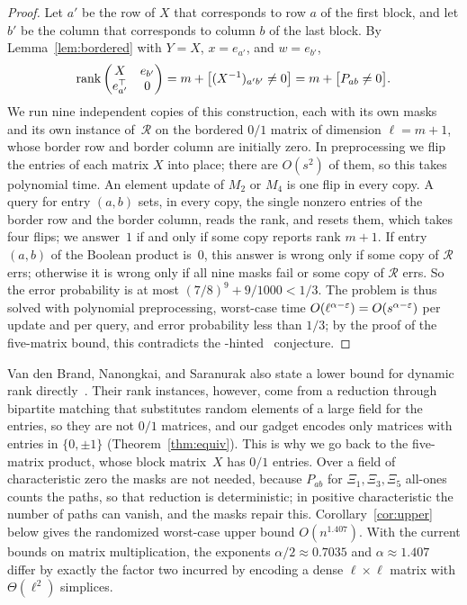 \begin{proof}
Let $a'$ be the row of $X$ that corresponds to row $a$ of the first block, and let $b'$ be the column that corresponds to column $b$ of the last block.
By Lemma~\ref{lem:bordered} with $Y=X$, $x=e_{a'}$, and $w=e_{b'}$,
\[
  \operatorname{rank}\begin{pmatrix}X&e_{b'}\\e_{a'}^{\top}&0\end{pmatrix}=m+\bigl[(X^{-1})_{a'b'}\neq0\bigr]=m+\bigl[P_{ab}\ne0\bigr].
\]
We run nine independent copies of this construction, each with its own masks and its own instance of~$\mathcal{R}$ on the bordered $0/1$ matrix of dimension $\ell=m+1$, whose border row and border column are initially zero.
In preprocessing we flip the entries of each matrix $X$ into place; there are $O(s^2)$ of them, so this takes polynomial time.
An element update of $M_2$ or $M_4$ is one flip in every copy.
A query for entry $(a,b)$ sets, in every copy, the single nonzero entries of the border row and the border column, reads the rank, and resets them, which takes four flips; we answer~$1$ if and only if some copy reports rank $m+1$.
If entry $(a,b)$ of the Boolean product is~$0$, this answer is wrong only if some copy of $\mathcal{R}$ errs; otherwise it is wrong only if all nine masks fail or some copy of $\mathcal{R}$ errs.
So the error probability is at most $(7/8)^9+9/1000<1/3$.
The problem is thus solved with polynomial preprocessing, worst-case time $O(\ell^{\alpha-\varepsilon})=O(s^{\alpha-\varepsilon})$ per update and per query, and error probability less than $1/3$; by the proof of the five-matrix bound, this contradicts the \uMv-hinted \uMv\ conjecture.
\end{proof}

Van den Brand, Nanongkai, and Saranurak also state a lower bound for dynamic rank directly~\cite[Corollary~5.15]{vdBNS19full}.
Their rank instances, however, come from a reduction through bipartite matching that substitutes random elements of a large field for the entries, so they are not $0/1$ matrices, and our gadget encodes only matrices with entries in $\{0,\pm1\}$ (Theorem~\ref{thm:equiv}).
This is why we go back to the five-matrix product, whose block matrix~$X$ has $0/1$ entries.
Over a field of characteristic zero the masks are not needed, because $P_{ab}$ for $\Xi_1,\Xi_3,\Xi_5$ all-ones counts the paths, so that reduction is deterministic; in positive characteristic the number of paths can vanish, and the masks repair this.
Corollary~\ref{cor:upper} below gives the randomized worst-case upper bound $O(n^{1.407})$.
With the current bounds on matrix multiplication, the exponents $\alpha/2\approx0.7035$ and $\alpha\approx1.407$ differ by exactly the factor two incurred by encoding a dense $\ell\times\ell$ matrix with $\Theta(\ell^2)$ simplices.


